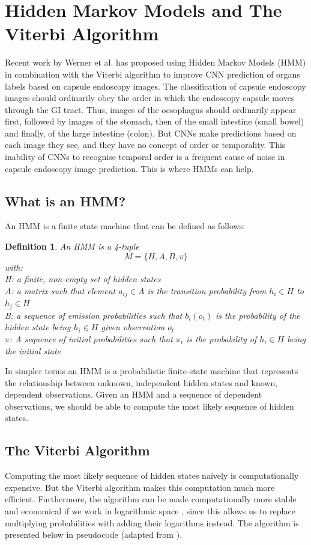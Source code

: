 \documentclass[11pt,a4paper, open=any]{scrbook}
\newtheorem{definition}{Definition}[chapter]
\newcounter{algorithm}[chapter]
\begin{document}
\section{Hidden Markov Models and The Viterbi Algorithm}
Recent work by Werner et al. \cite{werner23} has proposed using Hidden Markov Models (HMM) in combination with the Viterbi algorithm to improve CNN prediction of organs labels based on capsule endoscopy images. The classification of capsule endoscopy images should ordinarily obey the order in which the endoscopy capsule moves through the GI tract. Thus, images of the oesophagus should ordinarily appear first, followed by images of the stomach, then of the small intestine (small bowel) and finally, of the large intestine (colon). But CNNs make predictions based on each image they see, and they have no concept of order or temporality. This inability of CNNs to recognise temporal order is a frequent cause of noise in capsule endoscopy image prediction. This is where HMMs can help.

\subsection{What is an HMM?}
An HMM is a finite state machine that can be defined as follows:

\begin{definition}\label{def:hmm}
	An HMM is a 4-tuple
	\[
	M = \{H,A,B,\pi\}
	\] with:\\
	H: a finite, non-empty set of hidden states\\
	A: a matrix such that element $a_{ij} \in A$ is the transition probability from $h_i\in H$ to $h_j \in H$\\
	B: a sequence of emission probabilities such that  $b_i(o_t)$ is the probability of the hidden state being $h_i \in H$ given observation $o_t$\\
	$\pi$: A sequence of initial probabilities such that $\pi_i$ is the probability of $h_i \in H$ being the initial state
\end{definition}

In simpler terms an HMM is a probabilistic finite-state machine that represents the relationship between unknown, independent hidden states and known, dependent observations. Given an HMM and a sequence of dependent observations, we should be able to compute the most likely sequence of hidden states.

\subsection{The Viterbi Algorithm}
Computing the most likely sequence of hidden states naïvely is computationally expensive. But the Viterbi algorithm makes this computation much more efficient. Furthermore, the algorithm can be made computationally more stable and economical if we work in logarithmic space \cite{blog_viterbi}, since this allows us to replace multiplying probabilities with adding their logarithms instead. The algorithm is presented below in pseudocode (adapted from \cite{blog_viterbi}).
\end{document}
